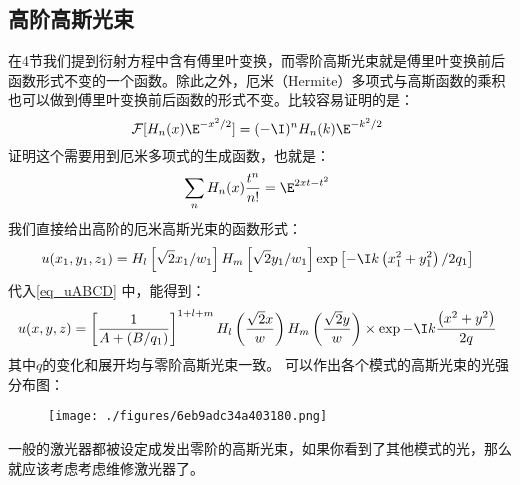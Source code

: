 \subsection{高阶高斯光束}
在4节我们提到衍射方程中含有傅里叶变换，而零阶高斯光束就是傅里叶变换前后函数形式不变的一个函数。除此之外，厄米（Hermite）多项式与高斯函数的乘积也可以做到傅里叶变换前后函数的形式不变。比较容易证明的是：
\begin{equation}
\mathcal F[H_n(x)\E^{-x^2/2}]=(-\I)^nH_n(k)\E^{-k^2/2}~
\end{equation}
证明这个需要用到厄米多项式的生成函数，也就是：
\begin{equation}
\sum_n H_n(x)\frac{t^n}{n!}=\E^{2xt-t^2}~
\end{equation}
我们直接给出高阶的厄米高斯光束的函数形式：
\begin{equation}
u(x_1,y_1,z_1)=H_l\left[\sqrt{2}x_1/w_1\right]H_m\left[\sqrt{2}y_1/w_1\right]\exp\left[-\I k\left(x_1^2+y_1^2\right)/2q_1\right]~
\end{equation}
代入\autoref{eq_uABCD} 中，能得到：
\begin{equation}
u(x,y,z)=\left[\frac{1}{A+(B/q_1)}\right]^{1+l+m}H_l\left(\frac{\sqrt{2}x}{w}\right)H_m\left(\frac{\sqrt{2}y}{w}\right)\times\exp-\I k\frac{\left(x^2+y^2\right)}{2q}~
\end{equation}
其中$q$的变化和展开均与零阶高斯光束一致。
可以作出各个模式的高斯光束的光强分布图：

\begin{figure}[ht]
\centering
\texttt{[image: ./figures/6eb9adc34a403180.png]}
\caption{} \label{fig_GBeam_16}
\end{figure}

一般的激光器都被设定成发出零阶的高斯光束，如果你看到了其他模式的光，那么就应该考虑考虑维修激光器了。